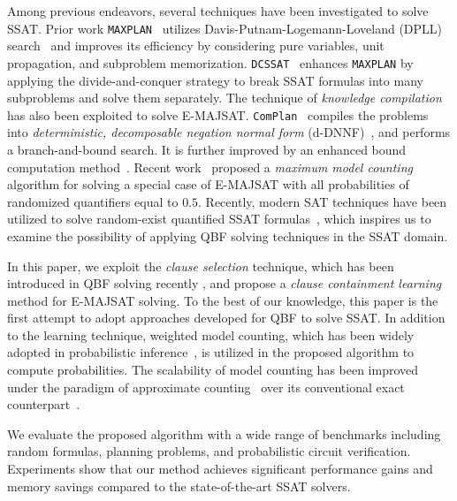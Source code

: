     Among previous endeavors, several techniques have been investigated to solve SSAT.
    Prior work \texttt{MAXPLAN}~\cite{Majercik1998} utilizes Davis-Putnam-Logemann-Loveland (DPLL) search~\cite{Davis1962} and improves its efficiency by considering pure variables, unit propagation, and subproblem memorization.
    \texttt{DCSSAT}~\cite{Majercik2005} enhances \texttt{MAXPLAN} by applying the divide-and-conquer strategy to break SSAT formulas into many subproblems and solve them separately.
    The technique of \textit{knowledge compilation} has also been exploited to solve E-MAJSAT.
    \texttt{ComPlan}~\cite{Huang2006} compiles the problems into \textit{deterministic, decomposable negation normal form} (d-DNNF)~\cite{Darwiche2001,Darwiche2002dDNNF}, and performs a branch-and-bound search.
    It is further improved by an enhanced bound computation method~\cite{Pipatsrisawat2009}.
    Recent work~\cite{Fremont2017} proposed a \textit{maximum model counting} algorithm for solving a special case of E-MAJSAT with all probabilities of randomized quantifiers equal to $0.5$.
    Recently, modern SAT techniques have been utilized to solve random-exist quantified SSAT formulas~\cite{LeeIJCAI17RESSAT}, which inspires us to examine the possibility of applying QBF solving techniques in the SSAT domain.

    In this paper, we exploit the \textit{clause selection} technique, which has been introduced in QBF solving recently \cite{Janota2015,Rabe2015}, and
    propose a \textit{clause containment learning} method for E-MAJSAT solving.
    To the best of our knowledge, this paper is the first attempt to adopt approaches developed for QBF to solve SSAT.
    In addition to the learning technique, weighted model counting, which has been widely adopted in probabilistic inference~\cite{Sang2005BayesianInference,Chavira2008}, is utilized in the proposed algorithm to compute probabilities.
    The scalability of model counting has been improved under the paradigm of approximate counting~\cite{Chakraborty2016} over its conventional exact counterpart~\cite{Sang2004,Sang2005ModelCounting}.

    We evaluate the proposed algorithm with a wide range of benchmarks including random formulas,
    planning problems, and probabilistic circuit verification.
    Experiments show that our method achieves significant performance gains and memory savings compared to the state-of-the-art SSAT solvers.

